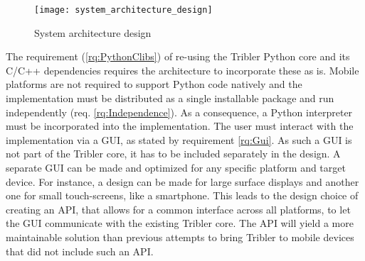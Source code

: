 \begin{figure}[H]
	\centering
	\texttt{[image: system\_architecture\_design]}
	\caption{System architecture design}
	\label{fig:system_architecture_design}
\end{figure}

The requirement (\ref{rq:PythonClibs}) of re-using the Tribler Python core and its C/C++ dependencies requires the architecture to incorporate these as is.
Mobile platforms are not required to support Python code natively and the implementation must be distributed as a single installable package and run independently (req. \ref{rq:Independence}).
As a consequence, a Python interpreter must be incorporated into the implementation.
The user must interact with the implementation via a GUI, as stated by requirement \ref{rq:Gui}.
As such a GUI is not part of the Tribler core, it has to be included separately in the design.
A separate GUI can be made and optimized for any specific platform and target device. %
For instance, a design can be made for large surface displays and another one for small touch-screens, like a smartphone.
This leads to the design choice of creating an API, that allows for a common interface across all platforms, to let the GUI communicate with the existing Tribler core.
The API will yield a more maintainable solution than previous attempts to bring Tribler to mobile devices \cite{tribler2014play,tribler2014at3,tribler-anon-hd} that did not include such an API.

